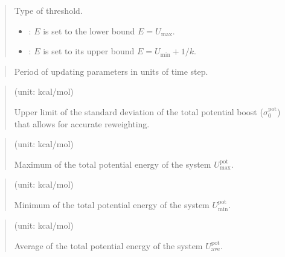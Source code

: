 \documentclass[a4paper,11pt,oneside,english]{sphinxmanual}
\begin{document}
 
\begin{quote}


Type of threshold.
\begin{itemize}
\item {} 
: \(E\) is set to the lower bound \(E = U_{\text{max}}\).

\item {} 
: \(E\) is set to its upper bound \(E = U_{\text{min}} + 1/k\).

\end{itemize}
\end{quote}

 
\begin{quote}


Period of updating parameters in units of time step.
\end{quote}

 
\begin{quote}

 (unit: kcal/mol)

Upper limit of the standard deviation of the total potential
boost (\(\sigma_0^{\mathrm{pot}}\)) that allows for
accurate reweighting.
\end{quote}

 
\begin{quote}

 (unit: kcal/mol)

Maximum of the total potential energy of the system \(U_{\mathrm{max}}^{\mathrm{pot}}\).
\end{quote}

 
\begin{quote}

 (unit: kcal/mol)

Minimum of the total potential energy of the system \(U_{\mathrm{min}}^{\mathrm{pot}}\).
\end{quote}

 
\begin{quote}

 (unit: kcal/mol)

Average of the total potential energy of the system \(U_{\mathrm{ave}}^{\mathrm{pot}}\).
\end{quote}
\end{document}
